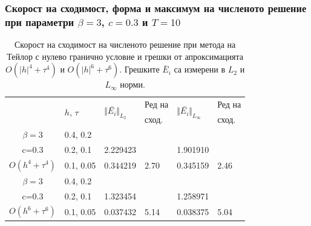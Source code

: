 \documentclass{article}
\theoremstyle{remark}
\begin{document}
\subsubsection{Скорост на сходимост, форма и максимум на численото решение при параметри $\beta = 3$, $c=0.3$ и $T=10$}
\begin{table}[ht]
\centering
\small
		\begin{tabular}{||c|l|ll|ll||}
			\hline
			\hline
      \multirow{2  }{*}{ }        & \multirow{2  }{*}{$h$, $\tau$}  &  	\multirow{2  }{*}{ $\Vert \bar{ E_i} \Vert_{L_2}$ }	&Ред на	& \multirow{2  }{*}{ $\Vert \bar{ E_i} \Vert_{L_\infty}$ } 		&Ред на   \\
	                                        &                                                & 							 					&  сход. 	& 								       					& сход. \\
\hline 
\hline 
       $\beta=3$        	&0.4, 0.2      &             	&            &           &   \\
           c=0.3    		&0.2, 0.1      &  2.229423 &            & 1.901910 &   \\
  $O(h^4+ \tau^4)$  	&0.1, 0.05   	&  0.344219 	&2.70  	 & 0.345159  &  2.46 \\

\hline
  $\beta=3$     		&0.4, 0.2   	&            	&          	&                  &      \\
      c=0.3                  &0.2, 0.1   	&1.323454   &            &1.258971 &   \\
 $O(h^6+ \tau^6)$ 	&0.1, 0.05 	&  0.037432 	&5.14  	 &0.038375  & 5.04 \\
\hline
\hline 
		\end{tabular}
		\caption{Скорост на сходимост на численото решение при метода на Тейлор с нулево гранично условие и грешки от апроксимацията $O(|h|^{4} + \tau^4 )$ и $O(|h|^{6} + \tau^6 )$. Грешките $\bar E_i$ са измерени в $L_2$ и $L_\infty$ норми.}
\label{tableH}
\end{table}
\end{document}

